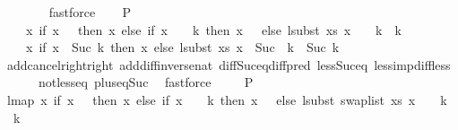 \begin{isabellebody}
\ \ \ \ \ \ \isamarkupfalse%
\ fastforce\isanewline
\isanewline
\ \ \isamarkupfalse%
\ P{}{\isacharcolon}{\kern0pt}\isanewline
\ \ \ \ {\isachardoublequoteopen}{\isacharparenleft}{\kern0pt}{\isasymlambda}x{\isachardot}{\kern0pt}\ if\ x\ {\isacharequal}{\kern0pt}\ {}\ then\ x\ else\ {\isacharparenleft}{\kern0pt}if\ x\ {\isacharminus}{\kern0pt}\ {}\ {\isacharless}{\kern0pt}\ k\ then\ x\ {\isacharminus}{\kern0pt}\ {}\ else\ lsubst\ xs\ {\isacharparenleft}{\kern0pt}x\ {\isacharminus}{\kern0pt}\ {}\ {\isacharminus}{\kern0pt}\ k{\isacharparenright}{\kern0pt}\ {\isacharplus}{\kern0pt}\ k{\isacharparenright}{\kern0pt}\ {\isacharplus}{\kern0pt}\ {}{\isacharparenright}{\kern0pt}\ {\isacharequal}{\kern0pt}\isanewline
\ \ \ \ {\isacharparenleft}{\kern0pt}{\isasymlambda}x{\isachardot}{\kern0pt}\ if\ x\ {\isacharless}{\kern0pt}\ Suc\ k\ then\ x\ else\ lsubst\ xs\ {\isacharparenleft}{\kern0pt}x\ {\isacharminus}{\kern0pt}\ {\isacharparenleft}{\kern0pt}Suc\ \ k{\isacharparenright}{\kern0pt}{\isacharparenright}{\kern0pt}\ {\isacharplus}{\kern0pt}\ {\isacharparenleft}{\kern0pt}Suc\ k{\isacharparenright}{\kern0pt}{\isacharparenright}{\kern0pt}{\isachardoublequoteclose}\isanewline
\ \ \ \ \isamarkupfalse%
\ add{\isacharunderscore}{\kern0pt}cancel{\isacharunderscore}{\kern0pt}right{\isacharunderscore}{\kern0pt}right\ add{\isacharunderscore}{\kern0pt}diff{\isacharunderscore}{\kern0pt}inverse{\isacharunderscore}{\kern0pt}nat\ diff{\isacharunderscore}{\kern0pt}Suc{\isacharunderscore}{\kern0pt}eq{\isacharunderscore}{\kern0pt}diff{\isacharunderscore}{\kern0pt}pred\ less{\isacharunderscore}{\kern0pt}Suc{\isacharunderscore}{\kern0pt}eq\ less{\isacharunderscore}{\kern0pt}imp{\isacharunderscore}{\kern0pt}diff{\isacharunderscore}{\kern0pt}less\isanewline
\ \ \ \ \ \ not{\isacharunderscore}{\kern0pt}less{\isacharunderscore}{\kern0pt}eq\ plus{\isacharunderscore}{\kern0pt}{}{\isacharunderscore}{\kern0pt}eq{\isacharunderscore}{\kern0pt}Suc\ \isamarkupfalse%
\ fastforce\isanewline
\isanewline
\isanewline
\ \ \ \isamarkupfalse%
\ P{}{\isacharcolon}{\kern0pt}\isanewline
\ {\isachardoublequoteopen}lmap\ {\isacharparenleft}{\kern0pt}{\isasymlambda}x{\isachardot}{\kern0pt}\ if\ x\ {\isacharequal}{\kern0pt}\ {}\ then\ x\ else\ {\isacharparenleft}{\kern0pt}if\ x\ {\isacharminus}{\kern0pt}\ {}\ {\isacharless}{\kern0pt}\ k\ then\ x\ {\isacharminus}{\kern0pt}\ {}\ else\ lsubst\ {\isacharparenleft}{\kern0pt}swap{\isacharunderscore}{\kern0pt}list\ xs{\isacharparenright}{\kern0pt}\ {\isacharparenleft}{\kern0pt}x\ {\isacharminus}{\kern0pt}\ {}\ {\isacharminus}{\kern0pt}\ k{\isacharparenright}{\kern0pt}\ {\isacharplus}{\kern0pt}\ k{\isacharparenright}{\kern0pt}\ {\isacharplus}{\kern0pt}\ {}{\isacharparenright}{\kern0pt}\isanewline

\end{isabellebody}
